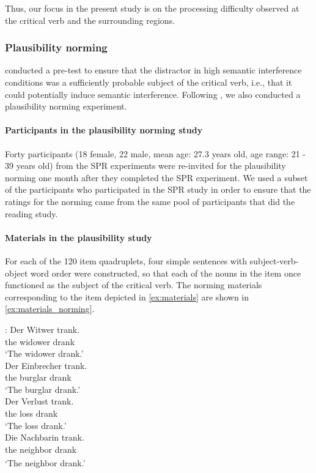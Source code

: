 \documentclass[a4paper, man, floatsintext]{apa7}
\begin{document}
Thus, our focus in the present study is on the processing difficulty observed at the critical verb and the surrounding regions.


\subsubsection{Plausibility norming}
\citeauthor{vandyke07} conducted a pre-test to ensure that the distractor in high semantic interference conditions was a sufficiently probable subject of the critical verb, i.e., that it could potentially induce semantic interference. Following \citeauthor{vandyke07}, we also conducted a plausibility norming experiment.

\paragraph{Participants in the plausibility norming study}
Forty participants (18 female, 22 male, mean age: 27.3 years old, age range: 21 - 39 years old) from the SPR experiments were re-invited for the plausibility norming one month after they completed the SPR experiment. We used a subset of the participants who participated in the SPR study in order to ensure that the ratings for the norming came from the same pool of participants that did the reading study.

\paragraph{Materials in the plausibility study}
For each of the 120 item quadruplets, four simple sentences with subject-verb-object word order were constructed, so that each of the nouns in the item once functioned as the subject of the critical verb. The norming materials corresponding to the item depicted in \ref{ex:materials} are shown in \ref{ex:materials_norming}.

\begin{exe}  
\ex \label{ex:materials_norming}
    \begin{xlist}   
    :\label{ex:subject} 
    \gll Der Witwer trank. \\ 
    the widower drank\\
    \trans  `The widower drank.'\\  
    \label{ex:animate_dist} 
    \gll Der Einbrecher trank. \\ 
    the burglar drank \\
    \trans `The burglar drank.' \\
   \label{ex:inanimate_dist} 
    \gll Der Verlust trank.  \\ 
    the loss drank\\
    \trans  `The loss drank.'\\  
    \label{ex:intro_noun} 
    \gll Die Nachbarin trank.\\ 
    the\textsubscript{} neighbor\textsubscript{} drank \\
    \trans `The neighbor drank.' \\
    \end{xlist}
\end{exe}
\end{document}
